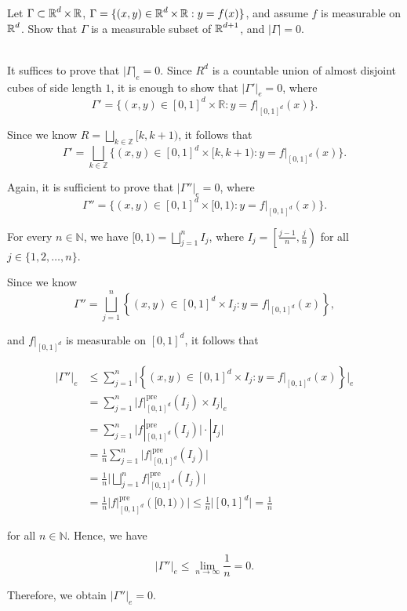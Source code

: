 \documentclass[UTF8,a4paper,10pt]{article}
\begin{document}
\pagebreak

\begin{Problem}[]{}
  Let \(\Gamma\subset \operatorname{\mathbb{R}}^d \times\operatorname{\mathbb{R}}\), \(\Gamma = \{(x,y)\in\operatorname{\mathbb{R}}^d\times\operatorname{\mathbb{R}}:y = f(x)\}\), and assume \(f\) is measurable on \(\operatorname{\mathbb{R}}^d\). Show that \(\Gamma\) is a measurable subset of \(\operatorname{\mathbb{R}}^{d+1}\), and \(|\Gamma| = 0.\)
\end{Problem}

\begin{solution}\,\\

  It suffices to prove that $|\Gamma|_e = 0$. Since $R^d$ is a countable union of almost disjoint cubes of side length $1$, it is enough to show that $|\Gamma'|_e = 0$, where 
  \[\Gamma' = \{(x, y) \in [0, 1]^d \times \mathbb{R} : y = f|_{[0,1]^d} (x)\}.\]

  Since we know $R = \bigsqcup _{k\in\mathbb{Z}}[k, k + 1)$, it follows that 
  \[\Gamma' = \bigsqcup_{k\in\mathbb{Z}}\{(x, y) \in [0, 1]^d \times [k, k + 1) : y = f|_{[0,1]^d} (x)\}.\]
  
  Again, it is sufficient to prove that $|\Gamma''|_e = 0$, where 
  \[\Gamma'' = \{(x, y) \in [0, 1]^d \times [0, 1) : y = f|_{[0,1]^d} (x)\}.\]
  
  For every $n \in \mathbb{N}$, we have $[0, 1) = \bigsqcup_{j=1}^n I_j$, where $I_j = \left[\frac{j - 1}{n}, \frac{j}{n}\right)$ for all $j \in \{1, 2, \ldots, n\}$.
  
  Since we know 
 \[\Gamma'' = \bigsqcup_{j=1}^n \left\{(x, y) \in [0, 1]^d \times I_j : y = f|_{[0,1]^d} (x)\right\},\]
  
  and $f|_{[0,1]^d}$ is measurable on $[0, 1]^d$, it follows that

  \begin{align*}
  |\Gamma''|_e &\le \sum_{j=1}^n \bigg|\left\{(x, y) \in [0, 1]^d \times I_j : y = f|_{[0,1]^d} (x)\right\}\bigg|_e \\
  &= \sum_{j=1}^n \bigg|f|_{[0,1]^d}^{\text{pre}} (I_j) \times I_j \bigg|_e \\
  &= \sum_{j=1}^n \bigg|f|_{[0,1]^d}^{\text{pre}} (I_j)\bigg| \cdot |I_j| \\
  &= \frac{1}{n} \sum_{j=1}^n \bigg|f|_{[0,1]^d}^{\text{pre}} (I_j)\bigg| \\
  &= \frac{1}{n} \bigg|\bigsqcup_{j=1}^n f|_{[0,1]^d}^{\text{pre}} (I_j)\bigg| \\
  &= \frac{1}{n} \bigg| f|_{[0,1]^d}^{\text{pre}} \left([0,1)\right)\bigg|  \le \frac{1}{n} \bigg|[0, 1]^d\bigg| = \frac{1}{n}
  \end{align*}

  for all $n \in \mathbb{N}$. Hence, we have

  \begin{equation*}
  |\Gamma''|_e \le \lim_{n \to \infty} \frac{1}{n} = 0.
  \end{equation*}

  Therefore, we obtain
  \(|\Gamma''|_e = 0.\)
    
\end{solution}
\end{document}
